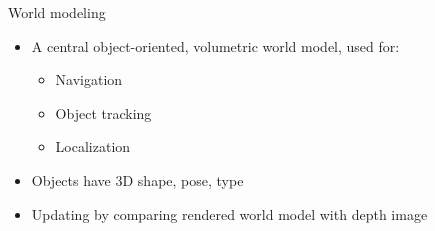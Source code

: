 \documentclass[a4paper,12pt]{article}
\newcommand{\emptylogo}{\texttt{[image: Figures/Empty]}}
\begin{document}
\begin{slidetop}
\begin{multicols}{2}
\begin{bclogo}[couleur = white, arrondi = 0.25, couleurBord = tuedarkblue, epBarre = 0, logo=\emptylogo]{\textcolor{tuedarkblue}{World modeling}}
\begin{itemize}[itemsep = 0pt, parsep = 0pt, leftmargin=15pt]
	\item A central object-oriented, volumetric world model, used for:	
	\begin{itemize}[itemsep = 0pt, parsep = 0pt, leftmargin=15pt]
		\item Navigation
		\item Object tracking
		\item Localization
	\end{itemize}
	\item Objects have 3D shape, pose, type
	\item Updating by comparing rendered world model with depth image
\end{itemize}
\end{bclogo}


\end{multicols}
\end{slidetop}
\end{document}
